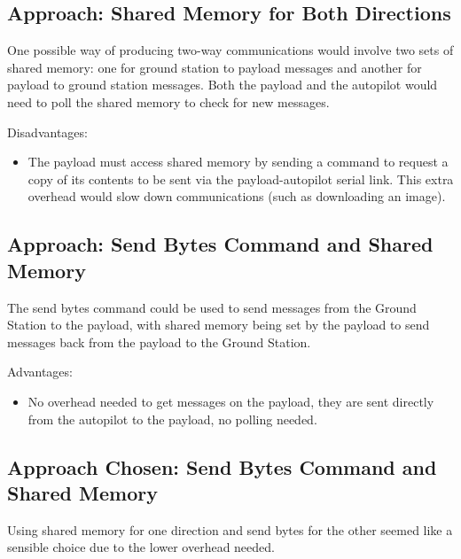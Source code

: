 \subsection{Approach: Shared Memory for Both Directions}
One possible way of producing two-way communications would involve two sets of shared memory: one for ground station to payload messages and another for payload to ground station messages. Both the payload and the autopilot would need to poll the shared memory to check for new messages.


Disadvantages:
\begin{itemize}
\item The payload must access shared memory by sending a command to request a copy of its contents to be sent via the payload-autopilot serial link. This extra overhead would slow down communications (such as downloading an image).
\end{itemize}


\subsection{Approach: Send Bytes Command and Shared Memory}
The send bytes command could be used to send messages from the Ground Station to the payload, with shared memory being set by the payload to send messages back from the payload to the Ground Station.

Advantages:
\begin{itemize}
\item No overhead needed to get messages on the payload, they are sent directly from the autopilot to the payload, no polling needed.
\end{itemize}


\subsection{Approach Chosen: Send Bytes Command and Shared Memory}
Using shared memory for one direction and send bytes for the other seemed like a sensible choice due to the lower overhead needed.